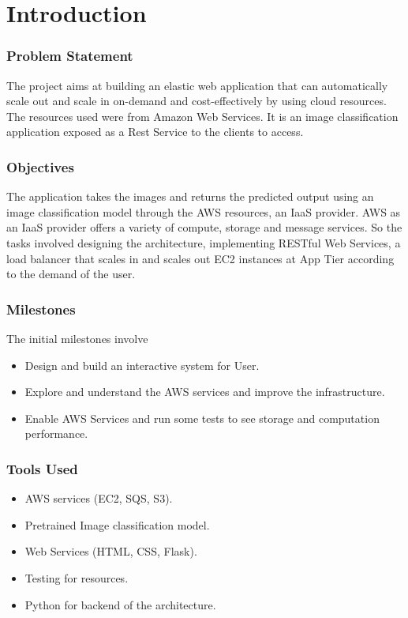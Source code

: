 \documentclass[../main.tex]{subfiles}
\begin{document}
\part*{Introduction}
\section*{Problem Statement}
The project aims at building an elastic web application that can automatically scale out and scale in on-demand and cost-effectively by using cloud resources. The resources used were from Amazon Web Services. It is an image classification application exposed as a Rest Service to the clients to access.

\section*{Objectives}
 The application takes the images and returns the predicted output using an image classification model through the AWS resources, an IaaS provider. AWS as an IaaS provider offers a variety of compute, storage and message services. So the tasks involved designing the architecture, implementing RESTful Web Services, a load balancer that scales in and scales out EC2 instances at App Tier according to the demand of the user.
 
\section*{Milestones}
The initial milestones involve
\begin{itemize}
\item Design and build an interactive system for User.
\item Explore and understand the AWS services and improve the infrastructure.
\item Enable AWS Services and run some tests to see storage and computation performance.
\end{itemize}

\section*{Tools Used}
\begin{itemize}
    \item AWS services (EC2, SQS, S3).
    \item Pretrained Image classification model.
    \item Web Services (HTML, CSS, Flask).
    \item Testing for resources.
    \item Python for backend of the architecture.
\end{itemize}
\end{document}
